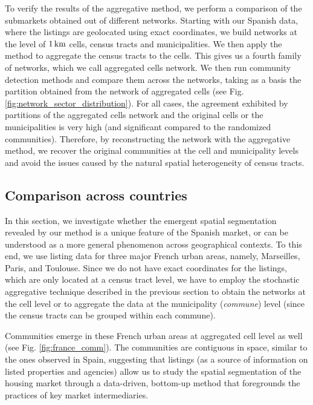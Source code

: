 To verify the results of the aggregative method, we perform a comparison of the submarkets obtained out of different networks. Starting with our Spanish data, where the listings are geolocated using exact coordinates, we build networks at the level of $1 \, \rm{km}$ cells, census tracts and municipalities. We then apply the method to aggregate the census tracts to the cells. This gives us a fourth family of networks, which we call aggregated cells network. We then run community detection methods and compare them across the networks, taking as a basis the partition obtained from the network of aggregated cells (see Fig. \ref{fig:network_sector_distribution}). For all cases, the agreement exhibited by partitions of the aggregated cells network and the original cells or the municipalities is very high (and significant compared to the randomized communities). Therefore, by reconstructing the network with the aggregative method, we recover the original communities at the cell and municipality levels and avoid the issues caused by the natural spatial heterogeneity of census tracts.

\subsection{Comparison across countries}\label{sec:France}

In this section, we investigate whether the emergent spatial segmentation revealed by our method is a unique feature of the Spanish market, or can be understood as a more general phenomenon across geographical contexts. To this end, we use listing data for three major French urban areas, namely, Marseilles, Paris, and Toulouse. Since we do not have exact coordinates for the listings, which are only located at a census tract level, we have to employ the stochastic aggregative technique described in the previous section to obtain the networks at the cell level or to aggregate the data at the municipality (\textit{commune}) level (since the census tracts can be grouped within each commune). 

Communities emerge in these French urban areas at aggregated cell level as well (see Fig. \ref{fig:france_comm}). The communities are contiguous in space, similar to the ones observed in Spain, suggesting that listings (as a source of information on listed properties and agencies) allow us to study the spatial segmentation of the housing market through a data-driven, bottom-up method that foregrounds the practices of key market intermediaries.

